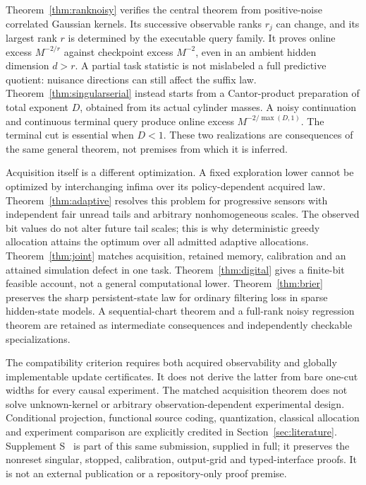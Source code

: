 Theorem~\ref{thm:ranknoisy} verifies the central theorem from positive-noise correlated Gaussian kernels. Its successive observable ranks $r_j$ can change, and its largest rank $r$ is determined by the executable query family. It proves online excess $M^{-2/r}$ against checkpoint excess $M^{-2}$, even in an ambient hidden dimension $d>r$. A partial task statistic is not mislabeled a full predictive quotient: nuisance directions can still affect the suffix law. Theorem~\ref{thm:singularserial} instead starts from a Cantor-product preparation of total exponent $D$, obtained from its actual cylinder masses. A noisy continuation and continuous terminal query produce online excess $M^{-2/\max(D,1)}$. The terminal cut is essential when $D<1$. These two realizations are consequences of the same general theorem, not premises from which it is inferred.

Acquisition itself is a different optimization. A fixed exploration lower cannot be optimized by interchanging infima over its policy-dependent acquired law. Theorem~\ref{thm:adaptive} resolves this problem for progressive sensors with independent fair unread tails and arbitrary nonhomogeneous scales. The observed bit values do not alter future tail scales; this is why deterministic greedy allocation attains the optimum over all admitted adaptive allocations. Theorem~\ref{thm:joint} matches acquisition, retained memory, calibration and an attained simulation defect in one task. Theorem~\ref{thm:digital} gives a finite-bit feasible account, not a general computational lower. Theorem~\ref{thm:brier} preserves the sharp persistent-state law for ordinary filtering loss in sparse hidden-state models. A sequential-chart theorem and a full-rank noisy regression theorem are retained as intermediate consequences and independently checkable specializations.

The compatibility criterion requires both acquired observability and globally implementable update certificates. It does not derive the latter from bare one-cut widths for every causal experiment. The matched acquisition theorem does not solve unknown-kernel or arbitrary observation-dependent experimental design. Conditional projection, functional source coding, quantization, classical allocation and experiment comparison are explicitly credited in Section~\ref{sec:literature}. Supplement S~\cite{companion} is part of this same submission, supplied in full; it preserves the nonreset singular, stopped, calibration, output-grid and typed-interface proofs. It is not an external publication or a repository-only proof premise.

